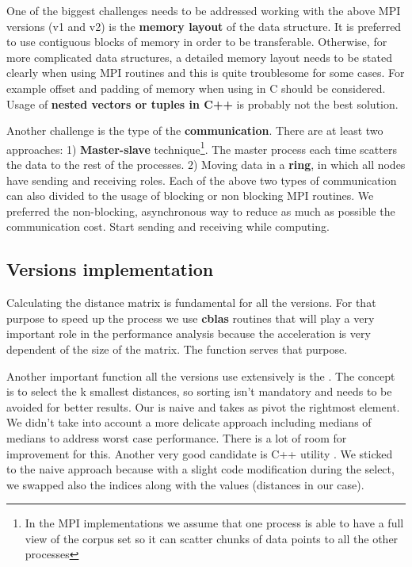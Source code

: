 \documentclass[12pt, a4paper]{article}
\begin{document}
One of the biggest challenges needs to be addressed working with the above MPI versions (v1 and v2) is the \textbf{memory layout} of the data structure. It is preferred to use contiguous blocks of memory in order to be transferable. Otherwise, for more complicated data structures, a detailed memory layout needs to be stated clearly when using MPI routines and this is quite troublesome for some cases. For example offset and padding of memory when using  in C should be considered. Usage of \textbf{nested vectors or tuples in C++} is probably not the best solution.  

Another challenge is the type of the \textbf{communication}. There are at least two approaches: 1) \textbf{Master-slave} technique\footnote{In the MPI implementations we assume that one process is able to have a full view of the corpus set so it can scatter chunks of data points to all the other processes}. The master process each time scatters the data to the rest of the processes. 2) Moving data in a \textbf{ring}, in which all nodes have sending and receiving roles.
Each of the above two types of communication can also divided to the usage of blocking or non blocking MPI routines. We preferred the non-blocking, asynchronous way to reduce as much as possible the communication cost. Start sending and receiving while computing.


\subsection{Versions implementation}

Calculating the distance matrix is fundamental for all the versions. For that purpose to speed up the process we use \textbf{cblas} routines that will play a very important role in the performance analysis because the acceleration is very dependent of the size of the matrix. The function  serves that purpose.

Another important function all the versions use extensively is the . The concept is to select the k smallest distances, so sorting isn't mandatory and needs to be avoided for better results. Our  is naive and takes as pivot the rightmost element. We didn't take into account a more delicate approach including medians of medians to address worst case performance. There is a lot of room for improvement for this. Another very good candidate is C++ utility . We sticked to the naive approach because with a slight code modification during the select, we swapped also the indices along with the values (distances in our case). 
\end{document}
